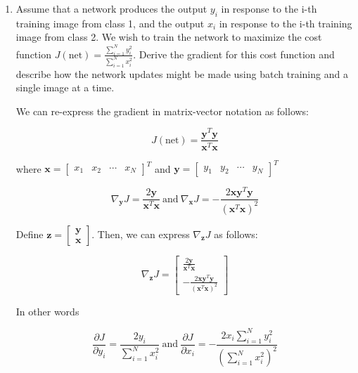 \documentclass[fleqn]{article}
\begin{document}
\begin{enumerate}
		\item Assume that a network produces the output $y_i$ in response to the i-th training image from class 1, and the output $x_i$ in response to the i-th training image from class 2. We wish to train the network to maximize the cost function $J(\text{net}) = \frac{\sum_{i=1}^{N}{y_i^2}}{\sum_{i=1}^{N}{x_i^2}}$. Derive the gradient for this cost function and describe how the network updates might be made using batch training and a single image at a time.
		
		We can re-express the gradient in matrix-vector notation as follows:
		
		\begin{equation*}
			J(\text{net}) = \frac{\mathbf{y}^T\mathbf{y}}{\mathbf{x}^T\mathbf{x}}
		\end{equation*}
		
		where $\mathbf{x} = \begin{bmatrix}x_1 & x_2 & \cdots & x_N \end{bmatrix}^T$ and $\mathbf{y} = \begin{bmatrix}y_1 & y_2 & \cdots & y_N \end{bmatrix}^T$
		
		\begin{equation*}
			\nabla_{\mathbf{y}}{J} = \frac{2\mathbf{y}}{\mathbf{x}^T\mathbf{x}} \ \text{and}\ \nabla_{\mathbf{x}}{J} = -\frac{2\mathbf{x}\mathbf{y}^T\mathbf{y}}{(\mathbf{x}^T\mathbf{x})^2}
		\end{equation*}
		
		Define $\mathbf{z} = \begin{bmatrix} \mathbf{y} \\ \mathbf{x} \end{bmatrix}$. Then, we can express $\nabla_{\mathbf{z}}{J}$ as follows:
		
		\begin{equation*}
			\nabla_{\mathbf{z}}{J} = \begin{bmatrix}
				\frac{2\mathbf{y}}{\mathbf{x}^T\mathbf{x}} \\[3pt]
				-\frac{2\mathbf{x}\mathbf{y}^T\mathbf{y}}{(\mathbf{x}^T\mathbf{x})^2}
			\end{bmatrix}
		\end{equation*}
		
		In other words
		
		\begin{equation*}
			\frac{\partial{J}}{\partial{y_i}} = \frac{2y_i}{\sum_{i=1}^{N}x_i^2}\ \text{and}\ \frac{\partial{J}}{\partial{x_i}} = -\frac{2x_i\sum_{i=1}^{N}y_i^2}{\left(\sum_{i=1}^{N}x_i^2\right)^2}
		\end{equation*}
		

\end{enumerate}
\end{document}
